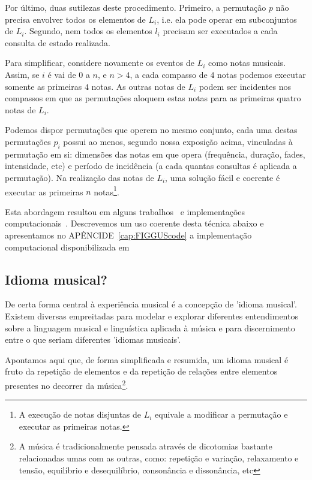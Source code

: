 Por último, duas sutilezas deste procedimento.
Primeiro, a permutação $p$ não precisa envolver todos os elementos de $L_i$, i.e. ela
pode operar em subconjuntos de $L_i$. Segundo, nem todos os elementos $l_i$ precisam ser executados a
cada consulta de estado realizada.

Para simplificar, considere novamente os eventos de $L_i$ 
como notas musicais. Assim, se $i$ é vai de $0$ a $n$, e $n>4$, a cada compasso
de $4$ notas podemos executar somente as primeiras $4$ notas. As outras notas de
$L_i$ podem ser incidentes nos compassos em que as permutações aloquem
estas notas para as primeiras quatro notas de $L_i$.

Podemos dispor permutações que operem no mesmo conjunto, cada uma destas permutações
$p_i$ possui ao menos, segundo nossa exposição acima, vinculadas à permutação em si: dimensões das notas em que opera (frequência, duração, fades, intensidade, etc) e período de incidência (a cada quantas consultas é aplicada a permutação). Na realização das notas de $L_i$, uma solução fácil e coerente é executar as primeiras $n$ notas\footnote{A execução de notas disjuntas de $L_i$ equivale a modificar a permutação e executar as primeiras notas.}.

Esta abordagem resultou em alguns trabalhos~\cite{figgusOriginal,figgusEspacializacao} e implementações computacionais~\cite{repoFIGGUS,repoFIGGUSold}. Descrevemos um uso coerente desta técnica abaixo e apresentamos no APÊNCIDE~\ref{cap:FIGGUScode} a implementação computacional disponibilizada em~\cite{repoFIGGUS}

\subsection{Idioma musical?}

De certa forma central à experiência musical é a concepção de 'idioma musical'.
Existem diversas empreitadas para modelar e explorar diferentes entendimentos
sobre a linguagem musical e linguística aplicada à música e para discernimento entre 
o que seriam diferentes
'idiomas musicais'\cite{Lerdahl, Harmonia, Schachter,Alfaix}.

Apontamos aqui que, de forma simplificada e resumida, um idioma musical é fruto da
repetição de elementos e da repetição de relações entre elementos presentes no decorrer da música\footnote{A
música é tradicionalmente pensada através de dicotomias bastante relacionadas umas com as outras,
como: repetição e variação, relaxamento e tensão, equilíbrio e desequilíbrio, consonância e dissonância, etc}. 

